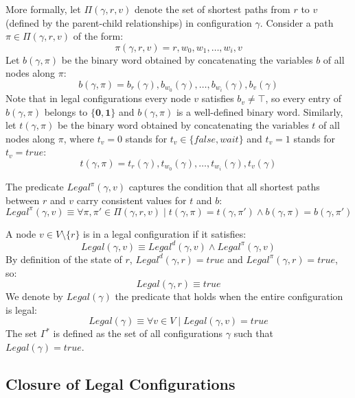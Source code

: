 \documentclass[a4paper, 12pt]{article}
\newcommand{\bz}{\mathbf{0}}
\newcommand{\bo}{\mathbf{1}}
\begin{document}
More formally, let $\Pi(\gamma, r, v)$ denote the set of shortest paths 
from $r$ to $v$ (defined by the parent-child relationships) in 
configuration $\gamma$. Consider a path $\pi \in \Pi(\gamma, r, v)$ of 
the form:
$$\pi(\gamma, r, v) = r, w_0, w_1, \dots, w_i, v$$
Let $b(\gamma,\pi)$ be the binary word obtained by concatenating the 
variables $b$ of all nodes along $\pi$:
$$b(\gamma,\pi) = b_{r}(\gamma), b_{w_0}(\gamma), \dots, 
b_{w_i}(\gamma), b_v(\gamma)$$
Note that in legal configurations every node $v$ satisfies 
$b_v \neq \top$, so every entry of $b(\gamma,\pi)$ belongs to 
$\{\bz, \bo\}$ and $b(\gamma,\pi)$ is a well-defined binary word. 
Similarly, let $t(\gamma,\pi)$ be the binary word obtained by 
concatenating the variables $t$ of all nodes along $\pi$, where 
$t_v = 0$ stands for $t_v \in \{\mathit{false}, \mathit{wait}\}$ and 
$t_v = 1$ stands for $t_v = \mathit{true}$:
$$t(\gamma,\pi) = t_{r}(\gamma), t_{w_0}(\gamma), \dots, 
t_{w_i}(\gamma), t_v(\gamma)$$

The predicate $Legal^{\pi}(\gamma,v)$ captures the condition that all 
shortest paths between $r$ and $v$ carry consistent values for $t$ 
and $b$:
\begin{equation}
    Legal^{\pi}(\gamma,v) \equiv 
    \forall \pi, \pi' \in \Pi(\gamma, r, v) \mid 
    t(\gamma,\pi) = t(\gamma,\pi') \wedge b(\gamma,\pi) = b(\gamma,\pi')
    \label{eq:legalpi}
\end{equation}

A node $v \in V \setminus \{r\}$ is in a legal configuration if it 
satisfies:
\begin{equation}
    Legal(\gamma,v) \equiv Legal^d(\gamma,v) \wedge Legal^\pi(\gamma,v)
    \label{eq:legalv}
\end{equation}
By definition of the state of $r$, $Legal^d(\gamma,r) = \mathit{true}$ 
and $Legal^\pi(\gamma,r) = \mathit{true}$, so:
\begin{equation}
    Legal(\gamma,r) \equiv \mathit{true}
    \label{eq:legalr}
\end{equation}
We denote by $Legal(\gamma)$ the predicate that holds when the entire 
configuration is legal:
\begin{equation}
    Legal(\gamma) \equiv \forall v \in V \mid Legal(\gamma,v) = 
    \mathit{true}
    \label{eq:legal}
\end{equation}
The set $\Gamma^*$ is defined as the set of all configurations $\gamma$ 
such that $Legal(\gamma) = \mathit{true}$.
\subsection{Closure of Legal Configurations}
\label{sec:closure}
\end{document}
